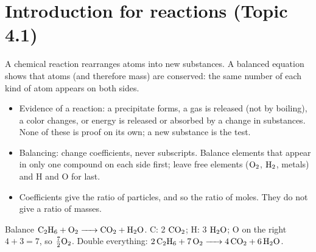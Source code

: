\documentclass[11pt]{article}
\begin{document}
\titleblock
\begin{abstract}
This guide covers all of Unit 4, Chemical Reactions, in ten sections: one for each of Topics 4.1--4.9 in course order, plus a final section on lab skills and free-response technique. Each section gives the definitions, equations and particle-level reasoning the topic needs, at least one worked example, the phrasing that earns free-response points and the mistakes that cost them. The worked examples use their own reactions and numbers, so none of them give away an item in \emph{Unit 4 Practice Set A} or \emph{Unit 4 Practice Set B}; the answer keys of both sets point back to the section numbers here. Plan on about 70 minutes for a full read with a calculator out.
\end{abstract}

\section{Introduction for reactions (Topic 4.1)}\label{t:4.1}
A chemical reaction rearranges atoms into new substances. A balanced equation shows that atoms (and therefore mass) are conserved: the same number of each kind of atom appears on both sides.
\begin{itemize}
\item Evidence of a reaction: a precipitate forms, a gas is released (not by boiling), a color changes, or energy is released or absorbed by a change in substances. None of these is proof on its own; a new substance is the test.
\item Balancing: change coefficients, never subscripts. Balance elements that appear in only one compound on each side first; leave free elements ($\ce{O2}$, $\ce{H2}$, metals) and H and O for last.
\item Coefficients give the ratio of particles, and so the ratio of moles. They do not give a ratio of masses.
\end{itemize}
 Balance $\ce{C2H6 + O2 -> CO2 + H2O}$. C: 2 $\ce{CO2}$; H: 3 $\ce{H2O}$; O on the right $4 + 3 = 7$, so $\tfrac72\ce{O2}$. Double everything: $\ce{2C2H6 + 7O2 -> 4CO2 + 6H2O}$.
\end{document}
